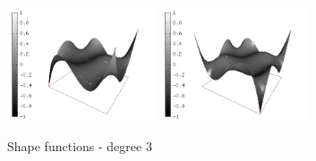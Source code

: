 \begin{figure}[H]
\begin{center}
\\
\includegraphics[width=4.4cm]{minor_examples/BasisFunctions015}
\includegraphics[width=4.4cm]{minor_examples/BasisFunctions016}
\end{center}
\caption{Shape functions - degree 3}
\vspace{-7mm}
\label{bubbleshape3q}
\end{figure}

